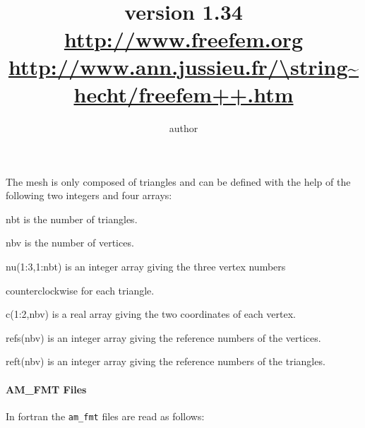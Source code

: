 \documentclass[twoside]{book}
\title{
\DeclareFixedFont{\TitreFont}{\encodingdefault}{pnc}{r}{\shapedefault}{80pt}
 {\Blue{ \TitreFont Freefem++ \\ \vglue 1cm  Manual}} \\ \vglue 5cm  ~ \\  
      \normalsize  { version 1.34  \Red{(Under construction)} }
 \\ \vglue 1cm
 \Large \url{http://www.freefem.org} \\
\url{http://www.ann.jussieu.fr/\string~hecht/freefem++.htm} 
}
\author{author}
\newif\ifpdf
\newenvironment{ttlist}
   {\begin{list}{}{\renewcommand{\makelabel}[1]{\texttt{##1}\hfil}%
        \setlength{\labelwidth}{3cm}
        \setlength{\leftmargin}{\labelwidth+\labelsep}
    }}%
   {\end{list}}
\begin{document}
\graphicspath{{./}{plots/}}
\ifpdf
\DeclareGraphicsExtensions{.pdf, .jpg, .tif}
\else
{}
\fi
\maketitle
\tableofcontents
\let\subsubsection\subsection
\let\subsection\section
\let\section\chapter

 The mesh is only composed of triangles and can be defined with the help of
the following two integers and four arrays:

  \begin{ttlist}
  \item [nbt] is the number of triangles.
  \item [nbv] is the number of vertices.
  
  \item [nu(1:3,1:nbt)] is an integer array giving the three vertex numbers
  
counterclockwise for each triangle.
 
  \item [c(1:2,nbv)]    is a real array giving the two coordinates of each vertex.
  \item [refs(nbv)]     is an integer array giving the reference numbers of the
vertices. 
  \item [reft(nbv)]     is an integer array giving the reference numbers of the 
triangles.
  \end{ttlist}

\paragraph{AM\_FMT Files}\label{AMFMT}
In fortran the  {\tt am\_fmt}  files are read as follows:
\end{document}
